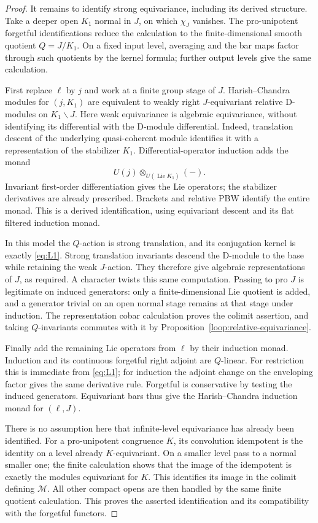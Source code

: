 \documentclass[11pt]{article}
\numberwithin{equation}{section}
\theoremstyle{definition}
\theoremstyle{remark}
\begin{document}
\begin{proof}
It remains to identify strong equivariance, including its derived
structure.  Take a deeper open $K_1$ normal in $J$, on which
$\chi_J$ vanishes.  The pro-unipotent forgetful identifications
reduce the calculation to the finite-dimensional smooth quotient
$Q=J/K_1$.  On a fixed input level, averaging and the bar maps
factor through such quotients by the kernel formula; further
output levels give the same calculation.

First replace $\ell$ by $j$ and work at a finite group stage of
$J$.  Harish--Chandra modules for $(j,K_1)$ are equivalent to
weakly right $J$-equivariant relative D-modules on $K_1\backslash J$.
Here weak equivariance is algebraic equivariance, without
identifying its differential with the D-module differential.
Indeed, translation descent of the underlying quasi-coherent
module identifies it with a representation of the stabilizer
$K_1$.  Differential-operator induction adds the monad
\[
                  U(j)\otimes_{U(\operatorname{Lie}K_1)}(-).
\]
Invariant first-order differentiation gives the Lie operators;
the stabilizer derivatives are already prescribed.  Brackets
and relative PBW identify the entire monad.  This is a derived
identification, using equivariant descent and its flat filtered
induction monad.

In this model the $Q$-action is strong translation, and its
conjugation kernel is exactly \eqref{eq:L1}.  Strong translation
invariants descend the D-module to the base while retaining the
weak $J$-action.  They therefore give algebraic representations
of $J$, as required.  A character twists this same computation.
Passing to pro $J$ is legitimate on induced generators: only a
finite-dimensional Lie quotient is added, and a generator
trivial on an open normal stage remains at that stage under
induction.  The representation cobar calculation proves the
colimit assertion, and taking $Q$-invariants commutes with it
by Proposition~\ref{loop:relative-equivariance}.

Finally add the remaining Lie operators from $\ell$ by their
induction monad.  Induction and its continuous forgetful right
adjoint are $Q$-linear.  For restriction this is immediate from
\eqref{eq:L1}; for induction the adjoint change on the
enveloping factor gives the same derivative rule.  Forgetful
is conservative by testing the induced generators.  Equivariant
bars thus give the Harish--Chandra induction monad for $(\ell,J)$.

There is no assumption here that infinite-level equivariance has
already been identified.  For a pro-unipotent congruence $K$, its
convolution idempotent is the identity on a level already
$K$-equivariant.  On a smaller level pass to a normal smaller
one; the finite calculation shows that the image of the
idempotent is exactly the modules equivariant for $K$.  This
identifies its image in the colimit defining $\mathcal M$.
All other compact opens are then handled by the same finite
quotient calculation.  This proves the asserted identification
and its compatibility with the forgetful functors.
\end{proof}
\end{document}
